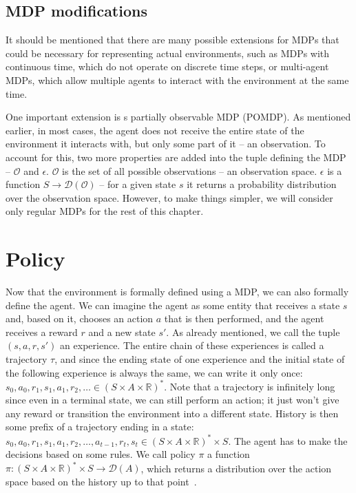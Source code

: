 \documentclass[
  digital,     %
  oneside,     %
  nosansbold,  %
  nocolorbold, %
  lof,         %
  lot,         %
]{fithesis4}
\begin{document}
\subsection{MDP modifications}
It should be mentioned that there are many possible extensions for MDPs that could be necessary for representing actual environments, such as MDPs with continuous time, which do not operate on discrete time steps, or multi-agent MDPs, which allow multiple agents to interact with the environment at the same time.

One important extension is s partially observable MDP (POMDP). As mentioned earlier, in most cases, the agent does not receive the entire state of the environment it interacts with, but only some part of it -- an observation. To account for this, two more properties are added into the tuple defining the MDP -- $\mathcal{O}$ and $\epsilon$. $\mathcal{O}$ is the set of all possible observations -- an observation space. $\epsilon$ is a function $S \to \mathcal{D}(\mathcal{O})$ -- for a given state $s$ it returns a probability distribution over the observation space. However, to make things simpler, we will consider only regular MDPs for the rest of this chapter.

\section{Policy}
Now that the environment is formally defined using a MDP, we can also formally define the agent. We can imagine the agent as some entity that receives a state $s$ and, based on it, chooses an action $a$ that is then performed, and the agent receives a reward $r$ and a new state $s'$. As already mentioned, we call the tuple $(s, a, r, s')$ an experience. The entire chain of these experiences is called a trajectory $\tau$, and since the ending state of one experience and the initial state of the following experience is always the same, we can write it only once: $s_0,a_0,r_1,s_1,a_1,r_2,\dotsc \in (S\times A \times \mathbb{R})^{*}$. Note that a trajectory is infinitely long since even in a terminal state, we can still perform an action; it just won't give any reward or transition the environment into a different state. History is then some prefix of a trajectory ending in a state: $s_0,a_0,r_1,s_1,a_1,r_2,\dotsc, a_{t-1},r_t,s_t\in (S\times A \times \mathbb{R})^{*}\times S$. The agent has to make the decisions based on some rules. We call policy $\pi$ a function $\pi\colon (S\times A \times \mathbb{R})^{*}\times S \to \mathcal{D}(A)$, which returns a distribution over the action space based on the history up to that point~\cite[p. 19]{PA230}.
\end{document}
